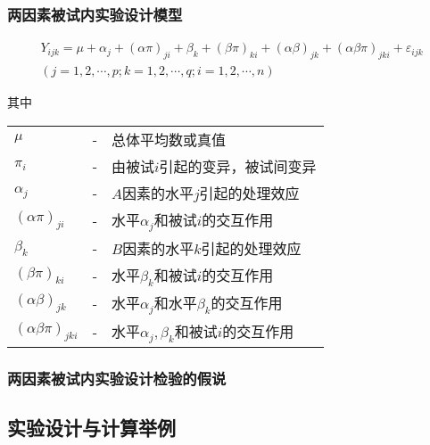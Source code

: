 \subsubsection{两因素被试内实验设计模型}

\begin{definition}[两因素被试内实验设计模型]

\begin{align*}
 Y_{ijk}=\mu +\alpha _j+\left( \alpha \pi \right) _{ji}+\beta _k+\left( \beta \pi \right) _{ki}+\left( \alpha \beta \right) _{jk}+\left( \alpha \beta \pi \right) _{jki}+\varepsilon _{ijk}\\
\left( j=1,2,\cdots ,p;k=1,2,\cdots ,q;i=1,2,\cdots ,n \right) 
\end{align*}

其中

\begin{tabular}{lcl}
    $\mu$                                        & - &    总体平均数或真值\\
    $\pi _i$                                     & - &    由被试$i$引起的变异，被试间变异\\
    $\alpha _j$                                  & - &    $A$因素的水平$j$引起的处理效应\\
    $\left( \alpha \pi \right) _{ji}$            & - &    水平$\alpha _j$和被试$i$的交互作用\\
    $\beta _k$                                   & - &    $B$因素的水平$k$引起的处理效应\\
    $\left( \beta \pi \right) _{ki}$             & - &    水平$\beta _k$和被试$i$的交互作用\\
    $\left( \alpha \beta \right) _{jk}$          & - &    水平$\alpha _j$和水平$\beta _k$的交互作用\\
    $\left( \alpha \beta \pi \right) _{jki}$     & - &    水平$\alpha _j, \beta _k$和被试$i$的交互作用\\
\end{tabular}

\end{definition}

\subsubsection{两因素被试内实验设计检验的假说}

\subsection{实验设计与计算举例}

